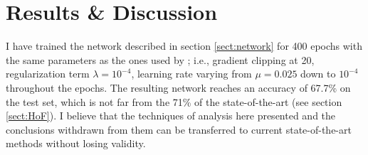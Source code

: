 \chapter{Results \& Discussion} \label{Chapter: Results}





I have trained the network described in section \ref{sect:network} for 400 epochs with the same parameters as the ones used by \cite{Jurtz2017}; i.e., gradient clipping at 20, regularization term $\lambda=10^{-4}$, learning rate varying from $\mu=0.025$ down to $10^{-4}$ throughout the epochs. The resulting network reaches an accuracy of 67.7\% on the test set, which is not far from the 71\% of the state-of-the-art (see section \ref{sect:HoF}).
I believe that the techniques of analysis here presented and the conclusions withdrawn from them can be transferred to current state-of-the-art methods without losing validity.

